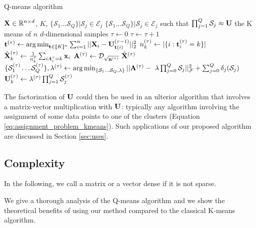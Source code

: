 \begin{algorithm}
\caption{Q-means algorithm}
\label{algo:qmeans}
\begin{algorithmic}[1]


\REQUIRE ${\mathbf{X}} \in \mathbb{R}^{n \times d}$, $K$, $\{\mathcal{S}_1 \dots \mathcal{S}_{Q}\}|\mathcal{S}_j \in \mathcal{E}_j$
\ENSURE $\{\mathcal{S}_1 \dots \mathcal{S}_{Q}\}|\mathcal{S}_j \in \mathcal{E}_j$ such that $\prod_{j=1}^{Q}\mathcal{S}_j \approx {\mathbf{U}}$ the K means of $n$ $d$-dimensional samples
\STATE $\tau \leftarrow 0$
\REPEAT
\STATE $\tau \leftarrow \tau + 1$
\STATE ${\mathbf{t}}^{(\tau)} \leftarrow \operatorname*{arg\,min}_{{\mathbf{t}} \in [\![K]\!]^n} \sum_{i=1}^{n} {||{\mathbf{X}}_i - {\mathbf{U}}^{(\tau -1)}_{{\mathbf{t}}(i)}||_2^2}$
\label{line:qmeans:assignment}
\label{line:qmeans:startkmeans}
\STATE $n_k^{(\tau)} \leftarrow |\{i: {\mathbf{t}}^{(\tau)}_i=k\}|$
\STATE $\hat{{\mathbf{X}}}^{(\tau)}_k \leftarrow \frac{1}{n^\tau_k} \sum_{i: {\mathbf{t}}^\tau_i = k} {{\mathbf{x}}_i}$
\ENDFOR
\label{line:qmeans:endkmeans}
\STATE ${\mathbf{A}}^{(\tau)} \leftarrow \mathcal{D}_{\sqrt{{\mathbf{n}}^{(\tau)}}}~\hat{{\mathbf{X}}}^{(\tau)} $
\STATE $\{\mathcal{S}^{(\tau)}_1 \dots \mathcal{S}^{(\tau)}_{Q}\}, \lambda^{(\tau)} \leftarrow \operatorname*{arg\,min}_{\{\mathcal{S}_1 \dots \mathcal{S}_Q, \lambda\}} ||{\mathbf{A}}^{(\tau)} - ~\lambda\prod_{j=0}^{Q}{\mathcal{S}_j}||_\mathcal{F}^2 + \sum_{j=0}^{Q} \delta_j(\mathcal{S}_j)$
\STATE ${\mathbf{U}}^{(\tau)}_k \leftarrow \lambda^{(\tau)} \prod_{j=1}^{Q}{\mathcal{S}_j^{(\tau)}}$

\end{algorithmic}
\end{algorithm}


The factorization of ${\mathbf{U}}$ could then be used in an ulterior algorithm that involves a matrix-vector multiplication with ${\mathbf{U}}$: typically any algorithm involving the assignment of some data points to one of the clusters (Equation \ref{eq:assignment_problem_kmeans}). Such applications of our proposed algorithm are discussed in Section \ref{sec:uses}.

\subsection{Complexity}

In the following, we call a matrix or a vector dense if it is not sparse.

We give a thorough analysis of the Q-means algorithm and we show the theoretical benefits of using our method compared to the classical K-means algorithm.


